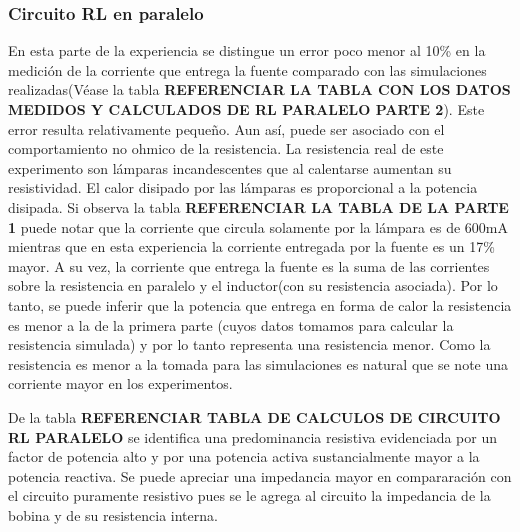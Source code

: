 \subsubsection{Circuito RL en paralelo}
En esta parte de la experiencia se distingue un error poco menor al 10\% en la medición de la corriente que entrega la fuente comparado con las simulaciones realizadas(Véase la tabla \textbf{REFERENCIAR LA TABLA CON LOS DATOS MEDIDOS Y CALCULADOS DE RL PARALELO PARTE 2}). Este error resulta relativamente pequeño. Aun así, puede ser asociado con el comportamiento no ohmico de la resistencia. La resistencia real de este experimento son lámparas incandescentes que al calentarse aumentan su resistividad. El calor disipado por las lámparas es proporcional a la potencia disipada. Si observa la tabla \textbf{REFERENCIAR LA TABLA DE LA PARTE 1} puede notar que la corriente que circula solamente por la lámpara es de 600mA mientras que en esta experiencia la corriente entregada por la fuente es un 17\% mayor. A su vez, la corriente que entrega la fuente es la suma de las corrientes sobre la resistencia en paralelo y el inductor(con su resistencia asociada). Por lo tanto, se puede inferir que la potencia que entrega en forma de calor la resistencia es menor a la de la primera parte (cuyos datos tomamos para calcular la resistencia simulada) y por lo tanto representa una resistencia menor. Como la resistencia es menor a la tomada para las simulaciones es natural que se note una corriente mayor en los experimentos.

De la tabla \textbf{REFERENCIAR TABLA DE CALCULOS DE CIRCUITO RL PARALELO} se identifica una predominancia resistiva evidenciada por un factor de potencia alto y por una potencia activa sustancialmente mayor a la potencia reactiva. Se puede apreciar una impedancia mayor en compararación con el circuito puramente resistivo pues se le agrega al circuito la impedancia de la bobina y de su resistencia interna. 



